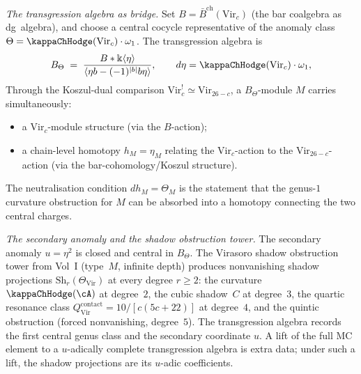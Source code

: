 \begin{computation}
\emph{The transgression algebra as bridge.}
Set $B=\bar B^{\mathrm{ch}}(\mathrm{Vir}_c)$
(the bar coalgebra as dg~algebra), and choose a central cocycle
representative of the anomaly class
\(\Theta=\kappaChHodge(\mathrm{Vir}_c)\cdot\omega_1\).  The
transgression algebra is
\[
B_\Theta
\;=\;
\frac{B*\Bbbk\langle\eta\rangle}
{\langle\eta b-(-1)^{|b|}b\eta\rangle},
\qquad
d\eta=\kappaChHodge(\mathrm{Vir}_c)\cdot\omega_1,
\]
Through
the Koszul-dual comparison
\(\mathrm{Vir}_c^!\simeq\mathrm{Vir}_{26-c}\), a
\(B_\Theta\)-module \(M\)
carries simultaneously:
\begin{itemize}
\item a $\mathrm{Vir}_c$-module structure (via the
 $B$-action);
\item a chain-level homotopy $h_M=\eta_M$ relating the
 $\mathrm{Vir}_c$-action to the $\mathrm{Vir}_{26-c}$-action
 (via the bar-cohomology/Koszul structure).
\end{itemize}
The neutralisation condition $dh_M=\Theta_M$ is the statement
that the genus-$1$ curvature obstruction for $M$ can be
absorbed into a homotopy connecting the two central charges.

\emph{The secondary anomaly and the shadow obstruction tower.}
The secondary anomaly $u=\eta^2$ is closed and central in
$B_\Theta$. The Virasoro shadow obstruction tower from Vol~I
(type~$M$, infinite depth) produces nonvanishing shadow
projections $\mathrm{Sh}_r(\Theta_{\mathrm{Vir}})$ at every
degree $r\ge 2$: the curvature~$\kappaChHodge(\cA)$ at degree~$2$,
the cubic shadow~$C$ at degree~$3$, the quartic resonance
class $Q^{\mathrm{contact}}_{\mathrm{Vir}}
=10/[c(5c{+}22)]$ at degree~$4$, and the quintic obstruction
(forced nonvanishing, degree~$5$).
The transgression algebra records the first central genus class and
the secondary coordinate \(u\).  A lift of the full MC element to a
\(u\)-adically complete transgression algebra is extra data; under
such a lift, the shadow projections are its \(u\)-adic coefficients.


\end{computation}
